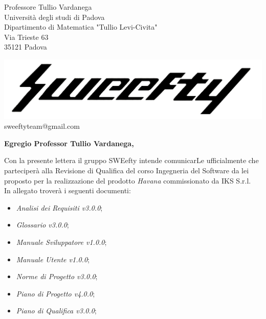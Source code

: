 \documentclass[12pt]{letter} %
\date{16/04/2018} %
\begin{document}



\begin{letter}{Professore Tullio Vardanega \\ Università degli studi di Padova \\ Dipartimento di Matematica "Tullio Levi-Civita" \\ Via Trieste 63 \\ 35121 Padova} %

\begin{center}
\includegraphics[width=\linewidth]{../../CommonImages/logo.jpg}
sweeftyteam@gmail.com
\end{center}

\opening{\textbf{Egregio Professor Tullio Vardanega,}}
\begin{addmargin}[2em]{2em}
  \hspace{1cm} Con la presente lettera il gruppo SWEefty intende comunicarLe ufficialmente che parteciperà alla Revisione di Qualifica del corso Ingegneria del Software da lei proposto per la realizzazione del prodotto \emph{Havana} commissionato da IKS S.r.l.\\
  In allegato troverà i seguenti documenti:
      \begin{itemize}
      \item \emph{Analisi dei Requisiti v3.0.0};
      \item \emph{Glossario v3.0.0};
      \item \emph{Manuale Sviluppatore v1.0.0};
      \item \emph{Manuale Utente v1.0.0};
       \item \emph{Norme di Progetto v3.0.0};
       \item \emph{Piano di Progetto v4.0.0};
      \item \emph{Piano di Qualifica v3.0.0};


\end{itemize}
\end{addmargin}
\end{letter}
\end{document}
